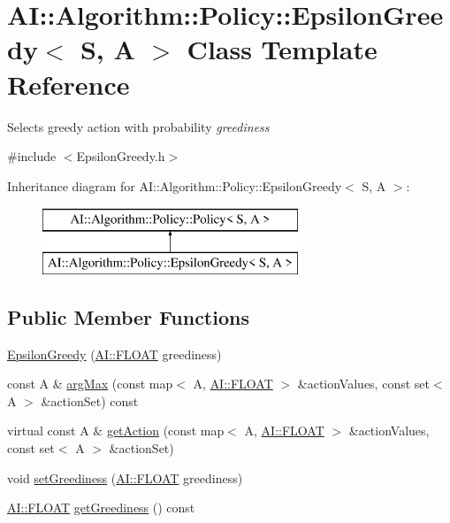 \hypertarget{classAI_1_1Algorithm_1_1Policy_1_1EpsilonGreedy}{\section{A\+I\+:\+:Algorithm\+:\+:Policy\+:\+:Epsilon\+Greedy$<$ S, A $>$ Class Template Reference}
\label{classAI_1_1Algorithm_1_1Policy_1_1EpsilonGreedy}
}


Selects greedy action with probability {\itshape greediness}  




{\ttfamily \#include $<$Epsilon\+Greedy.\+h$>$}

Inheritance diagram for A\+I\+:\+:Algorithm\+:\+:Policy\+:\+:Epsilon\+Greedy$<$ S, A $>$\+:\begin{figure}[H]
\begin{center}
\leavevmode
\includegraphics[height=2.000000cm]{classAI_1_1Algorithm_1_1Policy_1_1EpsilonGreedy}
\end{center}
\end{figure}
\subsection*{Public Member Functions}
\begin{DoxyCompactItemize}
\item 
\hyperlink{classAI_1_1Algorithm_1_1Policy_1_1EpsilonGreedy_ab891821ceb3fee0f098ceefad9f5a076}{Epsilon\+Greedy} (\hyperlink{namespaceAI_a41b74884a20833db653dded3918e05c3}{A\+I\+::\+F\+L\+O\+A\+T} greediness)
\item 
const A \& \hyperlink{classAI_1_1Algorithm_1_1Policy_1_1EpsilonGreedy_a1a7489821592b81576e5bc8674fc43c3}{arg\+Max} (const map$<$ A, \hyperlink{namespaceAI_a41b74884a20833db653dded3918e05c3}{A\+I\+::\+F\+L\+O\+A\+T} $>$ \&action\+Values, const set$<$ A $>$ \&action\+Set) const 
\item 
virtual const A \& \hyperlink{classAI_1_1Algorithm_1_1Policy_1_1EpsilonGreedy_a00a2dde7f4df14fd046e034694184f65}{get\+Action} (const map$<$ A, \hyperlink{namespaceAI_a41b74884a20833db653dded3918e05c3}{A\+I\+::\+F\+L\+O\+A\+T} $>$ \&action\+Values, const set$<$ A $>$ \&action\+Set)
\item 
void \hyperlink{classAI_1_1Algorithm_1_1Policy_1_1EpsilonGreedy_a2de58f47fa1663ff4718038f2b268295}{set\+Greediness} (\hyperlink{namespaceAI_a41b74884a20833db653dded3918e05c3}{A\+I\+::\+F\+L\+O\+A\+T} greediness)
\item 
\hyperlink{namespaceAI_a41b74884a20833db653dded3918e05c3}{A\+I\+::\+F\+L\+O\+A\+T} \hyperlink{classAI_1_1Algorithm_1_1Policy_1_1EpsilonGreedy_aac2b63fbb3cf29eb8ea11f21d8d6185d}{get\+Greediness} () const 
\end{DoxyCompactItemize}
